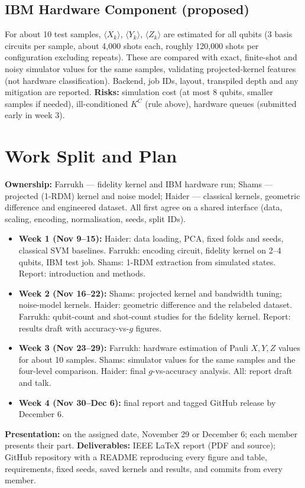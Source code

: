 \documentclass[conference]{IEEEtran}
\begin{document}
\subsection{IBM Hardware Component (proposed)}
For about 10 test samples, $\langle X_k\rangle$, $\langle Y_k\rangle$, $\langle Z_k\rangle$ are estimated for all qubits (3 basis circuits per sample, about 4{,}000 shots each, roughly 120{,}000 shots per configuration excluding repeats). These are compared with exact, finite-shot and noisy simulator values for the same samples, validating projected-kernel features (not hardware classification). Backend, job IDs, layout, transpiled depth and any mitigation are reported. \textbf{Risks:} simulation cost (at most 8 qubits, smaller samples if needed), ill-conditioned $K^{C}$ (rule above), hardware queues (submitted early in week 3).

\section{Work Split and Plan}
\textbf{Ownership:} Farrukh --- fidelity kernel and IBM hardware run; Shams --- projected (1-RDM) kernel and noise model; Haider --- classical kernels, geometric difference and engineered dataset. All first agree on a shared interface (data, scaling, encoding, normalisation, seeds, split IDs).
\begin{itemize}
\item \textbf{Week 1 (Nov 9--15):} Haider: data loading, PCA, fixed folds and seeds, classical SVM baselines. Farrukh: encoding circuit, fidelity kernel on 2--4 qubits, IBM test job. Shams: 1-RDM extraction from simulated states. Report: introduction and methods.
\item \textbf{Week 2 (Nov 16--22):} Shams: projected kernel and bandwidth tuning; noise-model kernels. Haider: geometric difference and the relabeled dataset. Farrukh: qubit-count and shot-count studies for the fidelity kernel. Report: results draft with accuracy-vs-$g$ figures.
\item \textbf{Week 3 (Nov 23--29):} Farrukh: hardware estimation of Pauli $X,Y,Z$ values for about 10 samples. Shams: simulator values for the same samples and the four-level comparison. Haider: final $g$-vs-accuracy analysis. All: report draft and talk.
\item \textbf{Week 4 (Nov 30--Dec 6):} final report and tagged GitHub release by December 6.
\end{itemize}
\textbf{Presentation:} on the assigned date, November 29 or December 6; each member presents their part.
\textbf{Deliverables:} IEEE LaTeX report (PDF and source); GitHub repository with a README reproducing every figure and table, requirements, fixed seeds, saved kernels and results, and commits from every member.
\end{document}
